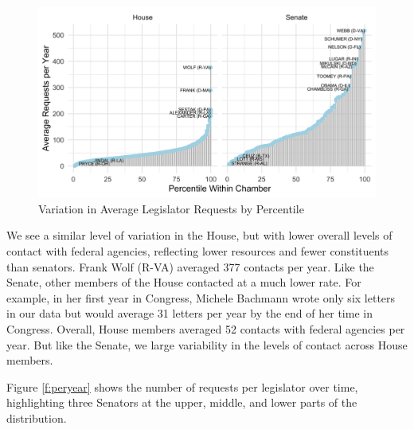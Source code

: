 \documentclass[12pt]{article}
\begin{document}
\begin{figure}
\centering
\caption{Variation in Average Legislator Requests by Percentile} \label{f:contact1} 
\begin{minipage}{\textwidth}
\includegraphics[width = \textwidth]{figs/percentiles-1}
\end{minipage}
\end{figure}


We see a similar level of variation in the House, but with lower overall levels of contact with federal agencies, reflecting lower resources and fewer constituents than senators. Frank Wolf (R-VA) averaged 377 contacts per year. Like the Senate, other members of the House contacted at a much lower rate.
For example, in her first year in Congress,  Michele Bachmann wrote only six letters in our data but would average 31 letters per year by the end of her time in Congress. 
Overall, House members averaged 52 contacts with federal agencies per year. But like the Senate, we large variability in the levels of contact across House members.  

Figure \ref{f:peryear} shows the number of requests per legislator over time, highlighting three Senators at the upper, middle, and lower parts of the distribution.
\end{document}
